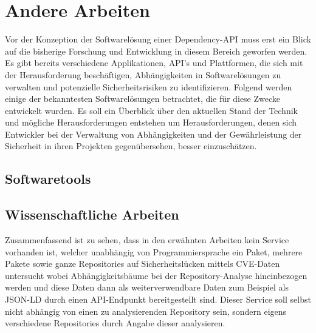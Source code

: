 \section{Andere Arbeiten} \label{sec:Andere}
    Vor der Konzeption der Softwarelösung einer Dependency-\ac{API} muss erst ein Blick auf die bisherige Forschung und Entwicklung in diesem Bereich geworfen werden.
    Es gibt bereits verschiedene Applikationen, \ac{API}'s und Plattformen, die sich mit der Herausforderung beschäftigen, Abhängigkeiten in Softwarelösungen zu verwalten und potenzielle Sicherheitsrisiken zu identifizieren.
    Folgend werden einige der bekanntesten Softwarelösungen betrachtet, die für diese Zwecke entwickelt wurden.
    Es soll ein Überblick über den aktuellen Stand der Technik und mögliche Herausforderungen entstehen um Herausforderungen, denen sich Entwickler bei der Verwaltung von Abhängigkeiten und der Gewährleistung der Sicherheit in ihren Projekten gegenübersehen, besser einzuschätzen.
    \subsection{Softwaretools} \label{subsec:Softwaretools}
    
    
    
    
    \newpage
    \subsection{Wissenschaftliche Arbeiten} \label{subsec:Wiss_Arbeiten}
    
    
    
    Zusammenfassend ist zu sehen, dass in den erwähnten Arbeiten kein Service vorhanden ist, welcher unabhängig von Programmiersprache ein Paket, mehrere Pakete sowie ganze Repositories auf Sicherheitslücken mittels \ac{CVE}-Daten untersucht wobei Abhängigkeitsbäume bei der Repository-Analyse hineinbezogen werden und diese Daten dann als weiterverwendbare Daten zum Beispiel als \ac{JSON-LD} durch einen \ac{API}-Endpunkt bereitgestellt sind.
    Dieser Service soll selbst nicht abhängig von einen zu analysierenden Repository sein, sondern eigens verschiedene Repositories durch Angabe dieser analysieren. 